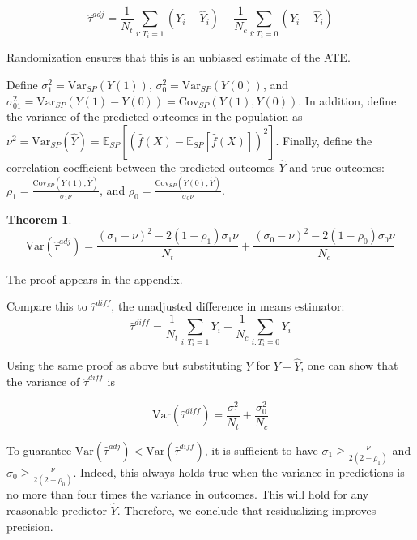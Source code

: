 \documentclass[12pt]{article}
\newtheorem{theorem}{Theorem}[section]
\newcommand{\ex}{\mathbb{E}} %
\newcommand{\var}{\textrm{Var}}
\newcommand{\cov}{\textrm{Cov}}
\begin{document}
$$\hat{\tau}^{adj} = \frac{1}{N_t} \sum_{i: T_i=1} (Y_i - \hat{Y}_i) - \frac{1}{N_c} \sum_{i: T_i = 0} (Y_i - \hat{Y}_i)$$

\noindent Randomization ensures that this is an unbiased estimate of the ATE.

Define $\sigma_1^2 = \var_{SP}(Y(1))$, $\sigma_0^2 = \var_{SP}(Y(0))$, and $\sigma_{01}^2 = \var_{SP}(Y(1) - Y(0)) = \cov_{SP}(Y(1), Y(0))$.  
In addition, define the variance of the predicted outcomes in the population as $\nu^2 = \var_{SP}(\hat{Y}) = \ex_{SP}\left[ (\hat{f}(X) - \ex_{SP}\left[ \hat{f}(X)\right] )^2 \right]$.
Finally, define the correlation coefficient between the predicted outcomes $\hat{Y}$ and true outcomes:
$\rho_1 = \frac{\cov_{SP}(Y(1), \hat{Y})}{\sigma_1\nu}$, and $\rho_0 = \frac{\cov_{SP}(Y(0), \hat{Y})}{\sigma_0\nu}$.

\begin{theorem}\label{thm:var_tau_hat_adjusted}
\begin{equation}\label{var_tau_hat_adjusted}
\var(\hat{\tau}^{adj}) = \frac{(\sigma_1 - \nu)^2 - 2(1-\rho_1)\sigma_1\nu}{N_t} + \frac{ (\sigma_0 - \nu)^2 - 2(1-\rho_0)\sigma_0\nu}{N_c}
\end{equation}
\end{theorem}

\noindent The proof appears in the appendix.

Compare this to $\hat{\tau}^{diff}$, the unadjusted difference in means estimator:
$$\hat{\tau}^{diff} = \frac{1}{N_t} \sum_{i: T_i=1}Y_i - \frac{1}{N_c} \sum_{i: T_i = 0} Y_i $$



\noindent Using the same proof as above but substituting $Y$ for $Y - \hat{Y}$, one can show that the variance of $\hat{\tau}^{diff}$ is

\begin{equation}
\var\left(\hat{\tau}^{diff}\right) = \frac{\sigma_1^2}{N_t} + \frac{\sigma_0^2}{N_c}
\end{equation}

To guarantee $\var(\hat{\tau}^{adj}) < \var(\hat{\tau}^{diff})$, it is sufficient to have $\sigma_1 \geq \frac{\nu}{2(2-\rho_1)}$ and $\sigma_0 \geq \frac{\nu}{2(2-\rho_0)}$.  
Indeed, this always holds true when the variance in predictions is no more than four times the variance in outcomes.  
This will hold for any reasonable predictor $\hat{Y}$.
Therefore, we conclude that residualizing improves precision.
\end{document}
